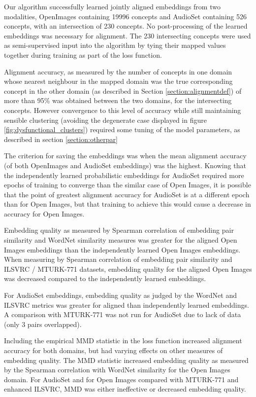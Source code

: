 Our algorithm successfully learned jointly aligned embeddings from two modalities, OpenImages containing 19996 concepts and AudioSet containing 526 concepts, with an intersection of 230 concepts. No post-processing of the learned embeddings was necessary for alignment. The 230 intersecting concepts were used as semi-supervised input into the algorithm by tying their mapped values together during training as part of the loss function. 

Alignment accuracy, as measured by the number of concepts in one domain whose nearest neighbour in the mapped domain was the true corresponding concept in the other domain (as described in Section \ref{section:alignmentdef})  of more than 95\% was obtained between the two domains, for the intersecting concepts. However convergence to this level of accuracy while still maintaining sensible clustering (avoiding the degenerate case displayed in figure \ref{fig:dysfunctional_clusters}) required some tuning of the model parameters, as described in section \ref{section:otherpar}
    
The criterion for saving the embeddings was when the mean alignment accuracy (of both OpenImages and AudioSet embeddings) was the highest. Knowing that the independently learned probabilistic embeddings for AudioSet required more epochs of training to converge than the similar case of Open Images, it is possible that the point of greatest alignment accuracy for AudioSet is at a different epoch than for Open Images, but that training to achieve this would cause a decrease in accuracy for Open Images. 

Embedding quality as measured by Spearman correlation of embedding pair similarity and WordNet similarity measures was greater for the aligned Open Images embeddings than the independently learned Open Images embeddings. When measuring by Spearman correlation of embedding pair similarity and ILSVRC / MTURK-771 datasets, embedding quality for the aligned Open Images was decreased compared to the independently learned embeddings.     

For AudioSet embeddings, embedding quality as judged by the WordNet and ILSVRC metrics was greater for aligned than independently learned embeddings. A comparison with MTURK-771 was not run for AudioSet due to lack of data (only 3 pairs overlapped).  

Including the empirical MMD statistic in the loss function increased alignment accuracy for both domains, but had varying effects on other measures of embedding quality. The MMD statistic increased embedding quality as measured by the Spearman correlation with WordNet similarity for the Open Images domain. For AudioSet and for Open Images compared with MTURK-771 and enhanced ILSVRC, MMD was either ineffective or decreased embedding quality. 

